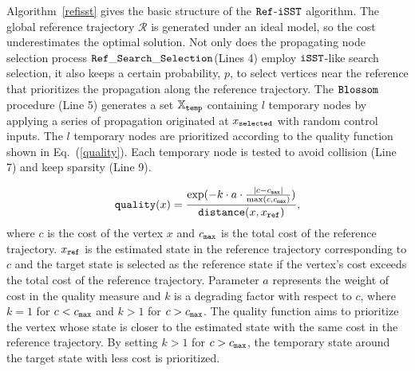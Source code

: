 \documentclass[conference, onecolumn]{IEEEtran}
\begin{document}
Algorithm~\ref{refisst} gives the basic structure of the $\tt Ref$-$\tt iSST$ algorithm. The global reference trajectory $\mathcal{R}$ is generated under an ideal model, so the cost underestimates the optimal solution. Not only does the propagating node selection process {$\tt Ref\_Search\_Selection$}(Lines 4) employ $\tt iSST$-like search selection, it also keeps a certain probability, $p$, to select vertices near the reference that prioritizes the propagation along the reference trajectory.
The $\tt Blossom$ procedure (Line 5) generates a set $\mathbb{X}_{\tt temp}$ containing $l$ temporary nodes by applying a series of propagation originated at $x_{\tt selected}$ with random control inputs. 
The $l$ temporary nodes are prioritized according to the quality function shown in Eq.~(\ref{quality}). Each temporary node is tested to avoid collision (Line 7) and keep sparsity (Line 9). %

\begin{equation}
	{\tt quality}(x) = 
		\frac{\exp(-k\cdot{a}\cdot{\frac{|c-c_{\tt max}|}{\max(c,c_{\tt max})})}}{{\tt distance}(x,x_{\tt ref})},
	\label{quality}
\end{equation}
where $c$ is the cost of the vertex $x$ and $c_{\tt max}$ is the total cost of the reference trajectory. $x_{\tt ref}$ is the estimated state in the reference trajectory corresponding to $c$ and the target state is selected as the reference state if the vertex's cost exceeds the total cost of the reference trajectory. Parameter $a$ represents the weight of cost in the quality measure and $k$ is a degrading factor with respect to $c$, where $k=1$ for $c<c_{\tt max}$ and $k>1$ for $c>c_{\tt max}$. The quality function aims to prioritize the vertex whose state is closer to the estimated state with the same cost in the reference trajectory. By setting $k>1$ for $c>c_{\tt max}$, the temporary state around the target state with less cost is prioritized.
\end{document}
